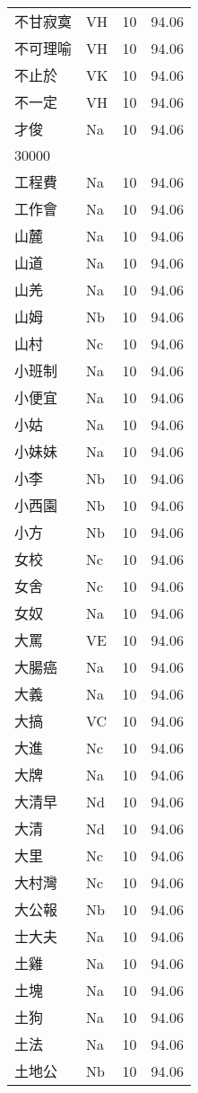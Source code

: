 \documentclass[twocolumn]{book}
\begin{document}
\begin{supertabular}{llrr}
不甘寂寞 & VH & 10 &  94.06\\
不可理喻 & VH & 10 &  94.06\\
不止於 & VK & 10 &  94.06\\
不一定 & VH & 10 &  94.06\\
才俊 & Na & 10 &  94.06\\
30000\\
工程費 & Na & 10 &  94.06\\
工作會 & Na & 10 &  94.06\\
山麓 & Na & 10 &  94.06\\
山道 & Na & 10 &  94.06\\
山羌 & Na & 10 &  94.06\\
山姆 & Nb & 10 &  94.06\\
山村 & Nc & 10 &  94.06\\
小班制 & Na & 10 &  94.06\\
小便宜 & Na & 10 &  94.06\\
小姑 & Na & 10 &  94.06\\
小妹妹 & Na & 10 &  94.06\\
小李 & Nb & 10 &  94.06\\
小西園 & Nb & 10 &  94.06\\
小方 & Nb & 10 &  94.06\\
女校 & Nc & 10 &  94.06\\
女舍 & Nc & 10 &  94.06\\
女奴 & Na & 10 &  94.06\\
大罵 & VE & 10 &  94.06\\
大腸癌 & Na & 10 &  94.06\\
大義 & Na & 10 &  94.06\\
大搞 & VC & 10 &  94.06\\
大進 & Nc & 10 &  94.06\\
大牌 & Na & 10 &  94.06\\
大清早 & Nd & 10 &  94.06\\
大清 & Nd & 10 &  94.06\\
大里 & Nc & 10 &  94.06\\
大村灣 & Nc & 10 &  94.06\\
大公報 & Nb & 10 &  94.06\\
士大夫 & Na & 10 &  94.06\\
土雞 & Na & 10 &  94.06\\
土塊 & Na & 10 &  94.06\\
土狗 & Na & 10 &  94.06\\
土法 & Na & 10 &  94.06\\
土地公 & Nb & 10 &  94.06\\

\end{supertabular}
\end{document}
